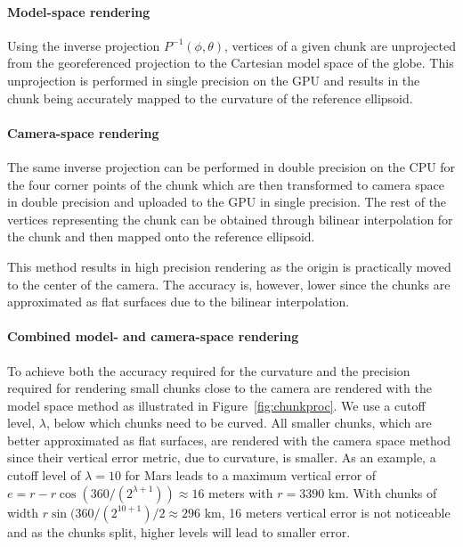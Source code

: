 \documentclass[journal]{vgtc}                %
\newcommand{\fig}[1]{Figure~\ref{fig:#1}}
\begin{document}
\vspace*{-1.5mm}
\paragraph{Model-space rendering}
Using the inverse projection $P^{-1}(\phi,\theta)$, vertices of a given chunk are unprojected from the georeferenced projection to the Cartesian model space of the globe.
This unprojection is performed in single precision on the GPU and results in the chunk being accurately mapped to the curvature of the reference ellipsoid.

\vspace*{-1.5mm}
\paragraph{Camera-space rendering}
The same inverse projection can be performed in double precision on the CPU for the four corner points of the chunk which are then transformed to camera space in double precision and uploaded to the GPU in single precision.
The rest of the vertices representing the chunk can be obtained through bilinear interpolation for the chunk and then mapped onto the reference ellipsoid.

This method results in high precision rendering as the origin is practically moved to the center of the camera.
The accuracy is, however, lower since the chunks are approximated as flat surfaces due to the bilinear interpolation.

\vspace*{-1.5mm}
\paragraph{Combined model- and camera-space rendering}
To achieve both the accuracy required for the curvature and the precision required for rendering small chunks close to the camera are rendered with the model space method as illustrated in \fig{chunkproc}. We use a cutoff level, $\lambda$, below which chunks need to be curved.
All smaller chunks, which are better approximated as flat surfaces, are rendered with the camera space method since their vertical error metric, due to curvature, is smaller.
As an example, a cutoff level of $\lambda = 10$ for Mars leads to a maximum vertical error of $e = r - r \cos{(360/(2^{\lambda + 1}))} \approx 16$ meters with $r=3 390$ km.
With chunks of width $r \sin{(360 / (2^{10 + 1})} / 2 \approx 296$ km, 16 meters vertical error is not noticeable and as the chunks split, higher levels will lead to smaller error.
\end{document}
